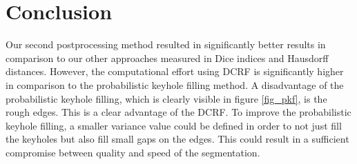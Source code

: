 \documentclass[journal]{IEEEtran}
\begin{document}
\section{Conclusion}
Our second postprocessing method resulted in significantly better results in comparison to our other approaches measured in Dice indices and Hausdorff distances. However, the computational effort using DCRF is significantly higher in comparison to the probabilistic keyhole filling method. A disadvantage of the probabilistic keyhole filling, which is clearly visible in figure \ref{fig_pkf}, is the rough edges. This is a clear advantage of the DCRF. To improve the probabilistic keyhole filling, a smaller variance value could be defined in order to not just fill the keyholes but also fill small gaps on the edges. This could result in a sufficient compromise between quality and speed of the segmentation.





%

\appendices


\end{document}
